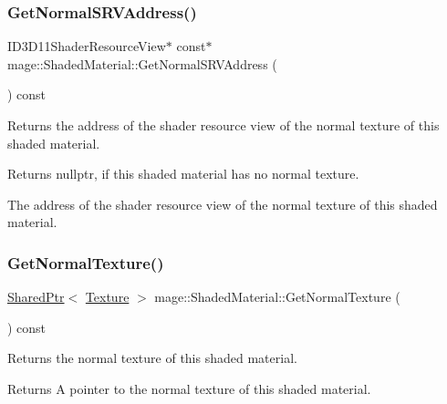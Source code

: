 \subsubsection{\texorpdfstring{Get\+Normal\+S\+R\+V\+Address()}{GetNormalSRVAddress()}}
{\footnotesize\ttfamily I\+D3\+D11\+Shader\+Resource\+View$\ast$ const$\ast$ mage\+::\+Shaded\+Material\+::\+Get\+Normal\+S\+R\+V\+Address (\begin{DoxyParamCaption}{ }\end{DoxyParamCaption}) const\hspace{0.3cm}{\ttfamily [noexcept]}}

Returns the address of the shader resource view of the normal texture of this shaded material.

\begin{DoxyReturn}{Returns}
{\ttfamily nullptr}, if this shaded material has no normal texture. 

The address of the shader resource view of the normal texture of this shaded material. 
\end{DoxyReturn}
\hypertarget{structmage_1_1_shaded_material_a879b003bf09d4985c028d134cdbe46eb}{}\label{structmage_1_1_shaded_material_a879b003bf09d4985c028d134cdbe46eb} 
\subsubsection{\texorpdfstring{Get\+Normal\+Texture()}{GetNormalTexture()}}
{\footnotesize\ttfamily \hyperlink{namespacemage_a1e01ae66713838a7a67d30e44c67703e}{Shared\+Ptr}$<$ \hyperlink{classmage_1_1_texture}{Texture} $>$ mage\+::\+Shaded\+Material\+::\+Get\+Normal\+Texture (\begin{DoxyParamCaption}{ }\end{DoxyParamCaption}) const\hspace{0.3cm}{\ttfamily [noexcept]}}

Returns the normal texture of this shaded material.

\begin{DoxyReturn}{Returns}
A pointer to the normal texture of this shaded material. 
\end{DoxyReturn}
\hypertarget{structmage_1_1_shaded_material_a1d1affd63d0a2dd8543a10600a267e0b}{}\label{structmage_1_1_shaded_material_a1d1affd63d0a2dd8543a10600a267e0b} 
